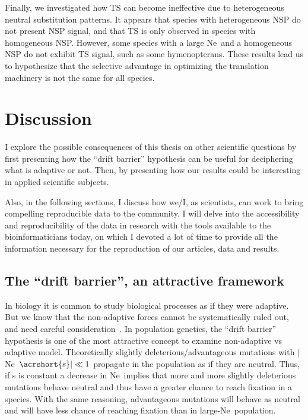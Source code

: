 Finally, we investigated how \acrshort{TS} can become ineffective due to heterogeneous neutral substitution patterns. It appears that species with heterogeneous \acrshort{NSP} do not present \acrshort{NSP} signal, and that \acrshort{TS} is only observed in species with homogeneous \acrshort{NSP}. However, some species with a large \acrshort{Ne}~and a homogeneous \acrshort{NSP} do not exhibit \acrshort{TS} signal, such as some hymenopterans. These results lead us to hypothesize that the selective advantage in optimizing the translation machinery is not the same for all species.


\section{Discussion}

I explore the possible consequences of this thesis on other scientific questions by first presenting how the “drift barrier” hypothesis can be useful for deciphering what is adaptive or not. Then, by presenting how our results could be interesting in applied scientific subjects.

Also, in the following sections, I discuss how we/I, as scientists, can work to bring compelling reproducible data to the community.
I will delve into the accessibility and reproducibility of the data in research with the tools available to the bioinformaticians today, on which I devoted a lot of time to provide all the information necessary for the reproduction of our articles, data and results.


\subsection{The “drift barrier”, an attractive framework}

In biology it is common to study biological processes as if they were adaptive. But we know that the non-adaptive forces cannot be systematically ruled out, and need careful consideration~\citep{lynch_frailty_2007}. In population genetics, the “drift barrier” hypothesis is one of the most attractive concept to examine non-adaptive vs adaptive model. Theoretically slightly deleterious/advantageous mutations with $|$\acrshort{Ne}~$\acrshort{s}| \ll 1 $ propagate in the population as if they are neutral. Thus, if \acrshort{s} is constant a decrease in \acrshort{Ne}~implies that more and more slightly deleterious mutations behave neutral and thus have a greater chance to reach fixation in a species. With the same reasoning, advantageous mutations will behave as neutral and will have less chance of reaching fixation than in large-\acrshort{Ne}~population.

